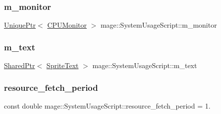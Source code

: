 \subsubsection{\texorpdfstring{m\+\_\+monitor}{m\_monitor}}
{\footnotesize\ttfamily \hyperlink{namespacemage_a8c307fbcc33bce9b7f2aa4c26c3b95cf}{Unique\+Ptr}$<$ \hyperlink{classmage_1_1_c_p_u_monitor}{C\+P\+U\+Monitor} $>$ mage\+::\+System\+Usage\+Script\+::m\+\_\+monitor\hspace{0.3cm}{\ttfamily [private]}}

\hypertarget{classmage_1_1_system_usage_script_af6dd5e39889458ffb042f1d13fbcd7ea}{}\label{classmage_1_1_system_usage_script_af6dd5e39889458ffb042f1d13fbcd7ea} 
\subsubsection{\texorpdfstring{m\+\_\+text}{m\_text}}
{\footnotesize\ttfamily \hyperlink{namespacemage_a1e01ae66713838a7a67d30e44c67703e}{Shared\+Ptr}$<$ \hyperlink{classmage_1_1_sprite_text}{Sprite\+Text} $>$ mage\+::\+System\+Usage\+Script\+::m\+\_\+text\hspace{0.3cm}{\ttfamily [private]}}

\hypertarget{classmage_1_1_system_usage_script_a98a30b1da6b9b87237e3509aed961162}{}\label{classmage_1_1_system_usage_script_a98a30b1da6b9b87237e3509aed961162} 
\subsubsection{\texorpdfstring{resource\+\_\+fetch\+\_\+period}{resource\_fetch\_period}}
{\footnotesize\ttfamily const double mage\+::\+System\+Usage\+Script\+::resource\+\_\+fetch\+\_\+period = 1.\hspace{0.3cm}{\ttfamily [static]}}


